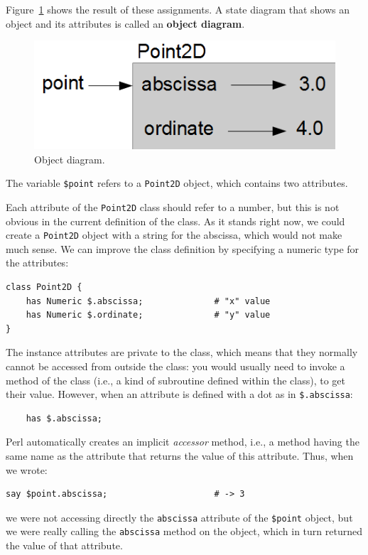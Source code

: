 Figure~\ref{fig.point2d} shows the result of these assignments.
A state diagram that shows an object and its attributes is
called an {\bf object diagram}.

\begin{figure}
\centerline
{\includegraphics[scale=0.8]{figs/point2D.png}}
\caption{Object diagram.}
\label{fig.point2d}
\end{figure}

The variable {\tt \$point} refers to a {\tt Point2D} object, 
which contains two attributes.  

Each attribute of the {\tt Point2D} class should refer to a 
number, but this is not obvious in the current definition of 
the class. As it stands right now, we could create a {\tt Point2D} 
object with a string for the abscissa, which would not make 
much sense. We can improve the class definition by specifying 
a numeric type for the attributes:
%
\begin{verbatim}
class Point2D {
    has Numeric $.abscissa;              # "x" value
    has Numeric $.ordinate;              # "y" value
}
\end{verbatim}
%
The instance attributes are private to the class, which means 
that they normally cannot be accessed from outside the class: 
you would usually need to invoke a method of the class 
(i.e., a kind of subroutine defined within the class), to get 
their value. However, when an attribute is defined with a dot 
as in \verb'$.abscissa':

\begin{verbatim}
    has $.abscissa;  
\end{verbatim}
%
Perl automatically creates an implicit \emph{accessor} method, 
i.e., a method having the same name as the attribute that returns 
the value of this attribute. Thus, when we wrote:

\begin{verbatim}
say $point.abscissa;                     # -> 3
\end{verbatim}
%
we were not accessing directly the {\tt abscissa} attribute of 
the \verb'$point' object, but we were really calling the 
{\tt abscissa} method on the object, which in turn returned 
the value of that attribute.

